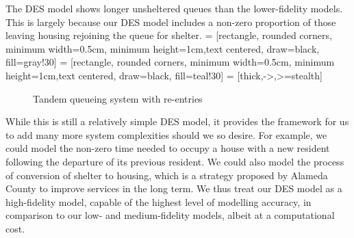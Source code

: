 \documentclass[12pt,a4paper]{article}
\begin{document}
 The DES model shows longer unsheltered queues than the lower-fidelity models. This is largely because our DES model includes a non-zero proportion of those leaving housing rejoining the queue for shelter.
%
 = [rectangle, rounded corners, minimum width=0.5cm, minimum height=1cm,text centered, draw=black, fill=gray!30]
 = [rectangle, rounded corners, minimum width=0.5cm, minimum height=1cm,text centered, draw=black, fill=teal!30]
 = [thick,->,>=stealth]
%
\begin{figure}
  \begin{center}
    \caption{Tandem queueing system with re-entries} \label{fig:des-q}
  \end{center}
\end{figure}
%
While this is still a relatively simple DES model, it provides the framework for us to add many more system complexities should we so desire. For example, we could model the non-zero time needed to occupy a house with a new resident following the departure of its previous resident. We could also model the process of conversion of shelter to housing, which is a strategy proposed by Alameda County to improve services in the long term. We thus treat our DES model as a high-fidelity model, capable of the highest level of modelling accuracy, in comparison to our low- and medium-fidelity models, albeit at a computational cost.

\newpage
\end{document}
